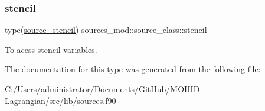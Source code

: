 \subsubsection{\texorpdfstring{stencil}{stencil}}
{\footnotesize\ttfamily type(\hyperlink{structsources__mod_1_1source__stencil}{source\+\_\+stencil}) sources\+\_\+mod\+::source\+\_\+class\+::stencil\hspace{0.3cm}{\ttfamily [private]}}



To acess stencil variables. 



The documentation for this type was generated from the following file\+:\begin{DoxyCompactItemize}
\item 
C\+:/\+Users/administrator/\+Documents/\+Git\+Hub/\+M\+O\+H\+I\+D-\/\+Lagrangian/src/lib/\hyperlink{sources_8f90}{sources.\+f90}\end{DoxyCompactItemize}
